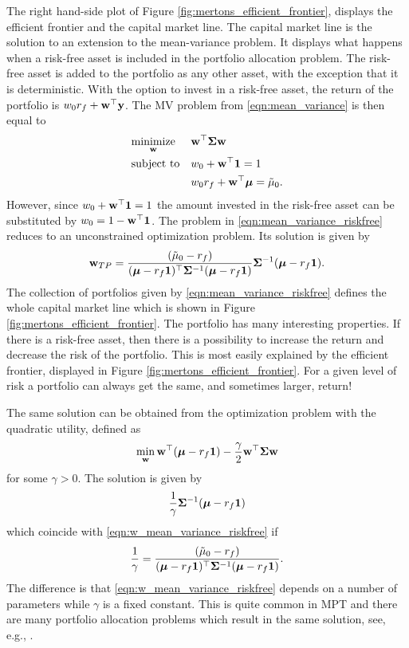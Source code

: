 \documentclass[12pt, twoside]{book}\usepackage{knitr}
\begin{document}
The right hand-side plot of Figure \ref{fig:mertons_efficient_frontier}, displays the efficient frontier and the capital market line.
The capital market line is the solution to an extension to the mean-variance problem.
It displays what happens when a risk-free asset is included in the portfolio allocation problem. 
The risk-free asset is added to the portfolio as any other asset, with the exception that it is deterministic.
With the option to invest in a risk-free asset, the return of the portfolio is $w_0 r_f + \mathbf{w}^\top \mathbf{y}$. 
The MV problem from \eqref{eqn:mean_variance} is then equal to
\begin{equation}\label{eqn:mean_variance_riskfree}
\begin{aligned}
& \underset{\mathbf{w}}{\text{minimize}} 
& & \mathbf{w}^\top \mathbf{\Sigma} \mathbf{w} \\
& \text{subject to}
& & w_0 + \mathbf{w}^\top \mathbf{1} = 1 \\
& && w_0 r_f + \mathbf{w}^\top \mbox{\boldmath$\mu$} = \tilde\mu_0. \\
\end{aligned}
\end{equation}
However, since $w_0 + \mathbf{w}^\top \mathbf{1}=1$ the amount invested in the risk-free asset can be substituted by $w_0=1-\mathbf{w}^\top \mathbf{1}$.
The problem in \eqref{eqn:mean_variance_riskfree} reduces to an unconstrained optimization problem. 
Its solution is given by 
\begin{equation}\label{eqn:w_mean_variance_riskfree}
  \mathbf{w}_{TP} = \frac{(\tilde\mu_0-r_f)}{(\mbox{\boldmath$\mu$}-r_f \mathbf{1})^\top \mathbf{\Sigma}^{-1} (\mbox{\boldmath$\mu$}-r_f \mathbf{1})} \mathbf{\Sigma}^{-1} (\mbox{\boldmath$\mu$}-r_f \mathbf{1}).
\end{equation}
The collection of portfolios given by \eqref{eqn:mean_variance_riskfree} defines the whole capital market line which is shown in Figure \ref{fig:mertons_efficient_frontier}. 
The portfolio has many interesting properties. 
If there is a risk-free asset, then there is a possibility to increase the return and decrease the risk of the portfolio. 
This is most easily explained by the efficient frontier, displayed in Figure \ref{fig:mertons_efficient_frontier}. 
For a given level of risk a portfolio can always get the same, and sometimes larger, return! 

The same solution can be obtained from the optimization problem with the quadratic utility, defined as 
$$\min_{\mathbf{w}} \mathbf{w}^\top (\mbox{\boldmath$\mu$}- r_f\mathbf{1}) - \frac{\gamma}{2} \mathbf{w}^\top \mathbf{\Sigma} \mathbf{w}$$ 
for some $\gamma > 0$.
The solution is given by 
\begin{equation}\label{eqn:TP_def}
  \frac{1}{\gamma}\mathbf{\Sigma}^{-1} (\mbox{\boldmath$\mu$}-r_f \mathbf{1})
\end{equation}
which coincide with \eqref{eqn:w_mean_variance_riskfree} if 
$$\frac{1}{\gamma} = \frac{(\tilde\mu_0-r_f)}{(\mbox{\boldmath$\mu$}-r_f \mathbf{1})^\top \mathbf{\Sigma}^{-1} (\mbox{\boldmath$\mu$}-r_f \mathbf{1})}.$$ 
The difference is that \eqref{eqn:w_mean_variance_riskfree} depends on a number of parameters while $\gamma$ is a fixed constant.
This is quite common in MPT and there are many portfolio allocation problems which result in the same solution, see, e.g., \citet{bodnar2013equivalence}.
\end{document}
